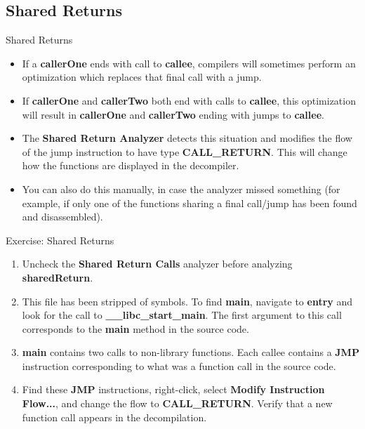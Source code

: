 \documentclass{beamer}
\begin{document}
\subsection{Shared Returns}
\begin{frame}
\begin{block}{Shared Returns}
\begin{itemize}
\item If a \textbf{callerOne} ends with call to \textbf{callee}, compilers will sometimes perform an optimization which replaces that final call with a jump.
\item If \textbf{callerOne} and \textbf{callerTwo} both end with calls to \textbf{callee}, this optimization will result in \textbf{callerOne} and \textbf{callerTwo} 
ending with jumps to \textbf{callee}.
\item The \textbf{Shared Return Analyzer} detects this situation and modifies the flow of the jump instruction to have type \textbf{CALL\_RETURN}. This will change how
the functions are displayed in the decompiler.
\item You can also do this manually, in case the analyzer missed something (for example, if only one of the functions sharing a final call/jump has been found and disassembled). 
\end{itemize}
\end{block}
\end{frame}

\begin{frame}
\begin{block}{Exercise: Shared Returns}
\begin{enumerate}
\item Uncheck the \textbf{Shared Return Calls} analyzer before analyzing \textbf{sharedReturn}.
\item This file has been stripped of symbols.  To find \textbf{main}, navigate to \textbf{entry} and look for the call to \textbf{\_\_libc\_start\_main}. The first argument to this 
call corresponds to the \textbf{main} method in the source code.   
\item \textbf{main} contains two calls to non-library functions.  Each callee contains a \textbf{JMP} instruction corresponding to what was a function call in the source code. 
\item Find these \textbf{JMP} instructions, right-click, select \textbf{Modify Instruction Flow...}, and change the flow to \textbf{CALL\_RETURN}. Verify that a new function call appears 
in the decompilation.
\end{enumerate}
\end{block}
\end{frame}
\end{document}
